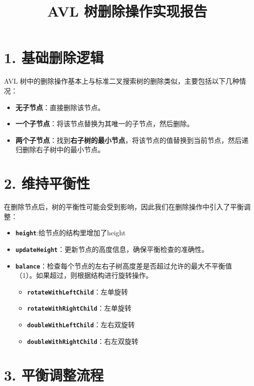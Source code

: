 \documentclass{article}
\title{\vspace{-5.5cm}AVL 树删除操作实现报告}
\author{}
\date{}
\begin{document}
\maketitle
\vspace{-6em}

\section*{1. 基础删除逻辑}

AVL 树中的删除操作基本上与标准二叉搜索树的删除类似，主要包括以下几种情况：
\begin{itemize}
    \item \textbf{无子节点}：直接删除该节点。
    \item \textbf{一个子节点}：将该节点替换为其唯一的子节点，然后删除。
    \item \textbf{两个子节点}：找到\textbf{右子树的最小节点}，将该节点的值替换到当前节点，然后递归删除右子树中的最小节点。
\end{itemize}



\section*{2. 维持平衡性}

在删除节点后，树的平衡性可能会受到影响，因此我们在删除操作中引入了平衡调整：
\begin{itemize}
    \item \textbf{\texttt{height}}:给节点的结构里增加了height
    \item \textbf{\texttt{updateHeight}}：更新节点的高度信息，确保平衡检查的准确性。
    \item \textbf{\texttt{balance}}：检查每个节点的左右子树高度差是否超过允许的最大不平衡值（1）。如果超过，则根据结构进行旋转操作。
    \begin{itemize}
        \item \textbf{\texttt{rotateWithLeftChild}}：左单旋转
        \item \textbf{\texttt{rotateWithRightChild}}：左单旋转
        \item \textbf{\texttt{doubleWithLeftChild}}：左右双旋转
        \item \textbf{\texttt{doubleWithRightChild}}：右左双旋转
    \end{itemize}
\end{itemize}

\section*{3. 平衡调整流程}
\end{document}
